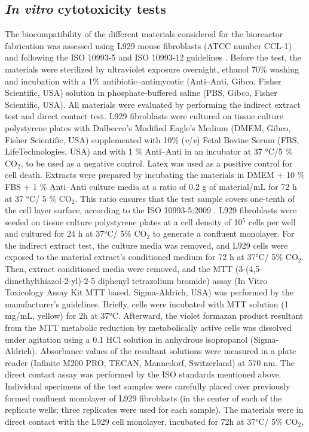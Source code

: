 \subsection{\textit{In vitro} cytotoxicity tests}
The biocompatibility of the different materials considered for the bioreactor fabrication was assessed using L929 mouse fibroblasts (ATCC number CCL-1) and following the ISO 10993-5 and ISO 10993-12 guidelines \cite{For_Standardization2009-wo}. Before the test, the materials were sterilized by ultraviolet exposure overnight, ethanol 70\si{\percent} washing and incubation with a 1\si{\percent} antibiotic--antimycotic (Anti--Anti, Gibco\texttrademark, Fisher Scientific, USA) solution in phosphate-buffered saline (PBS, Gibco\texttrademark, Fisher Scientific, USA). All materials were evaluated by performing the indirect extract test and direct contact test. L929 fibroblasts were cultured on tissue culture polystyrene plates with Dulbecco’s Modified Eagle’s Medium (DMEM, Gibco\texttrademark, Fisher Scientific, USA) supplemented with 10\si{\percent} (\emph{v}/\emph{v}) Fetal Bovine Serum (FBS, LifeTechnologies, USA) and with 1 \si{\percent} Anti--Anti in an incubator at 37 \si{\celsius}/5 \si{\percent} CO$_{2}$, to be used as a negative control. Latex was used as a positive control for cell death. Extracts were prepared by incubating the materials in DMEM + 10 \si{\percent} FBS + 1 \si{\percent} Anti--Anti culture media at a ratio of 0.2 \si{\gram} of material/\si{\milli\liter} for 72 \si{\hour} at 37 \si{\celsius}/ 5 \si{\percent} CO$_{2}$. This ratio ensures that the test sample covers one-tenth of the cell layer surface, according to the ISO 10993-5:2009 \cite{For_Standardization2009-wo}. L929 fibroblasts were seeded on tissue culture polystyrene plates at a cell density of 10$^{5}$ cells per well and cultured for 24 \si{\hour} at 37\si{\celsius}/ 5\si{\percent} CO$_{2}$ to generate a confluent monolayer. For the indirect extract test, the culture media was removed, and L929 cells were exposed to the material extract’s conditioned medium for 72 \si{\hour} at 37\si{\celsius}/ 5\si{\percent} CO$_{2}$. Then, extract conditioned media were removed, and the MTT (3-(4,5-dimethylthiazol-2-yl)-2-5 diphenyl tetrazolium bromide) assay (In Vitro Toxicology Assay Kit MTT based, Sigma-Aldrich, USA) was performed by the manufacturer’s guidelines. Briefly, cells were incubated with MTT solution (1 mg/mL, yellow) for 2\si{\hour} at 37\si{\celsius}. Afterward, the violet formazan product resultant from the MTT metabolic reduction by metabolically active cells was dissolved under agitation using a 0.1 \si{\molar} HCl solution in anhydrous isopropanol (Sigma-Aldrich). Absorbance values of the resultant solutions were measured in a plate reader (Infinite M200 PRO, TECAN, Mannedorf, Switzerland) at 570 \si{\nano\meter}. The direct contact assay was performed by the ISO standards mentioned above. Individual specimens of the test samples were carefully placed over previously formed confluent monolayer of L929 fibroblasts (in the center of each of the replicate wells; three replicates were used for each sample). The materials were in direct contact with the L929 cell monolayer, incubated for 72\si{\hour} at 37\si{\celsius}/ 5\si{\percent} CO$_{2}$, 